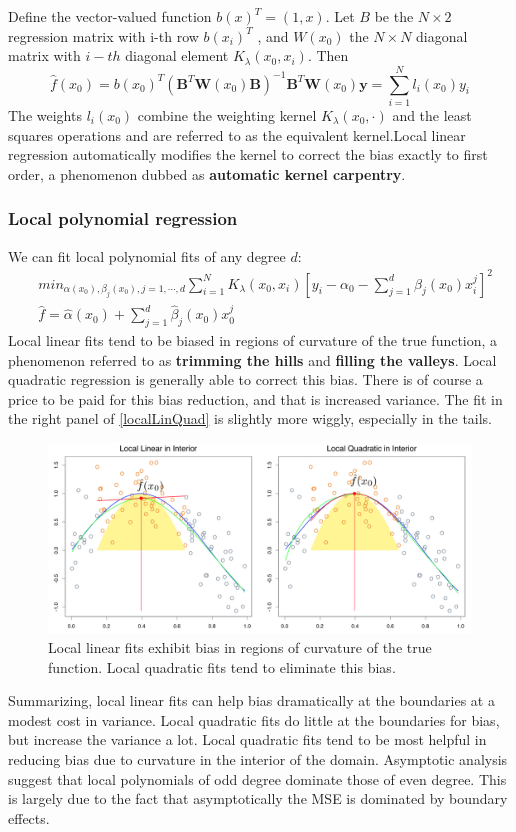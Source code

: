 \documentclass[12pt, letterpaper]{article}
\theoremstyle{definition}
\newcommand{\y}{\mathbf{y}}
\begin{document}
Define the vector-valued function $b(x)^T = (1, x)$. Let $B$ be the $N \times 2$ regression matrix with i-th row $b(x_i)^T$ , and $W(x_0)$ the $N \times N$ diagonal matrix with $i-th$ diagonal element $K_\lambda(x_0,x_i)$. Then
\begin{equation}
\hat{f}(x_0)= b(x_0)^T(\mathbf{B}^T\mathbf{W}(x_0)\mathbf{B})^{-1} \mathbf{B}^T\mathbf{W}(x_0)\y= \sum_{i=1}^N l_i(x_0)y_i
\end{equation}
The weights $l_i(x_0)$ combine the weighting kernel $K_\lambda(x_0, \cdot)$ and the least squares operations and are referred to as the equivalent kernel.Local linear regression automatically modifies the kernel to correct the bias exactly to
first order, a phenomenon dubbed as \textbf{automatic kernel carpentry}.

\subsubsection{Local polynomial regression}
We can fit local polynomial fits of any degree $d$:
\begin{equation}
\begin{aligned}
&min_{\alpha(x_0),\beta_j(x_0),j=1,\cdots,d} \sum_{i=1}^N K_\lambda(x_0,x_i)\left[ y_i - \alpha_0 -\sum_{j=1}^d\beta_j(x_0)x_i^j\right]^2\\
&\hat{f} = \hat{\alpha}(x_0) + \sum_{j=1}^d \hat{\beta}_j(x_0)x_0^j
\end{aligned}
\end{equation}
Local linear fits tend to be biased in regions of curvature of the true function, a phenomenon referred to as \textbf{trimming the hills} and \textbf{filling the valleys}. Local quadratic regression is generally able to correct this bias. There is of course a price to be paid for this bias reduction, and that is increased variance. The fit in the right panel of \autoref{localLinQuad} is slightly more
wiggly, especially in the tails.
\begin{figure}
\centering
\includegraphics[scale=0.4]{img/localLinQuad}
\caption{Local linear fits exhibit bias in regions of curvature of the true function. Local quadratic fits tend to eliminate this bias.}
\label{localLinQuad}
\end{figure}
Summarizing, local linear fits can help bias dramatically at the boundaries at a modest cost in variance. Local quadratic fits do little at the boundaries for bias, but increase the variance a lot. Local quadratic fits tend to be most helpful in reducing bias due to curvature in the interior of the domain. Asymptotic analysis suggest that local polynomials of odd degree dominate those of even degree. This is largely due to the fact that asymptotically the MSE is dominated by boundary effects.
\end{document}
